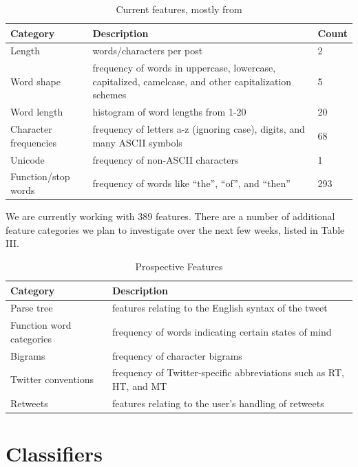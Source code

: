 \documentclass[10pt, conference, compsocconf]{IEEEtran}
\begin{document}
\begin{table}[h]
  \centering
  \begin{tabularx}{\linewidth}{l X l}
    \toprule
    \bf{Category} & \bf{Description} & \bf{Count} \\ \midrule
    Length & words/characters per post & 2 \\ \midrule
    Word shape & frequency of words in uppercase, lowercase, capitalized, camelcase, and other capitalization schemes & 5 \\ \midrule
    Word length & histogram of word lengths from 1-20 & 20 \\ \midrule
    Character frequencies & frequency of letters a-z (ignoring case), digits, and many ASCII symbols & 68 \\ \midrule
    Unicode & frequency of non-ASCII characters & 1 \\ \midrule
    Function/stop words & frequency of words like ``the'', ``of'', and ``then'' & 293 \\
    \bottomrule
  \end{tabularx}
  \caption{Current features, mostly from \cite{Narayanan}}
\end{table}
We are currently working with 389 features. There are a number of
additional feature categories we plan to investigate over the next few
weeks, listed in Table III.

\begin{table}[h]
  \centering
  \begin{tabularx}{\linewidth}{l X}
    \toprule
    \bf{Category} & \bf{Description} \\ \midrule
    Parse tree & features relating to the English syntax of the tweet \\ \midrule
    Function word categories & frequency of words indicating certain states of mind \\ \midrule
    Bigrams & frequency of character bigrams \\ \midrule
    Twitter conventions & frequency of Twitter-specific abbreviations such as RT, HT, and MT \\ \midrule
    Retweets & features relating to the user’s handling of retweets \\
    \bottomrule
  \end{tabularx}
  \caption{Prospective Features}
\end{table}

\section{Classifiers}
\end{document}
